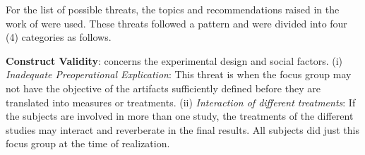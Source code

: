 \documentclass[a4paper,twoside,anonymous]{article}
\begin{document}
For the list of possible threats, the topics and recommendations raised in the work of \cite{Wohlin:2012} were used.
These threats followed a pattern and were divided into four (4) categories as follows.

\textbf{Construct Validity}: concerns the experimental design and social factors.
(i) \textit{Inadequate Preoperational Explication}: This threat is when the focus group may not have the objective of the artifacts sufficiently defined before they are translated into measures or treatments.
(ii) \textit{Interaction of different treatments}: If the subjects are involved in more than one study, the treatments of the different studies may interact and reverberate in the final results. 
All subjects did just this focus group at the time of realization.
\end{document}
